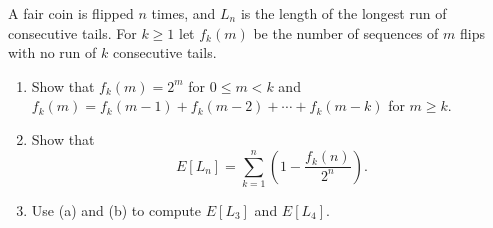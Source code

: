 A fair coin is flipped $n$ times, and $L_n$ is the length of the longest run of consecutive tails. For $k\ge1$ let $f_k(m)$ be the number of sequences of $m$ flips with no run of $k$ consecutive tails.
\begin{enumerate}
\item[(a)] Show that $f_k(m)=2^m$ for $0\le m<k$ and $f_k(m)=f_k(m-1)+f_k(m-2)+\cdots+f_k(m-k)$ for $m\ge k$.
\item[(b)] Show that
\[E[L_n]=\sum_{k=1}^{n}\left(1-\dfrac{f_k(n)}{2^n}\right).\]
\item[(c)] Use (a) and (b) to compute $E[L_3]$ and $E[L_4]$.
\end{enumerate}
